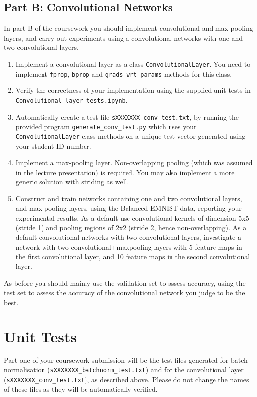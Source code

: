 \documentclass[11pt,]{article}
\begin{document}
\subsection*{Part B: Convolutional Networks}
In part B of the coursework you should implement convolutional  and max-pooling layers, and carry out experiments using a convolutional networks with one and two convolutional layers.  
\begin{enumerate}
  \item Implement a convolutional layer as a class \verb+ConvolutionalLayer+.  You need to implement \texttt{fprop}, \texttt{bprop} and \texttt{grads\_wrt\_params} methods for this class. 
  \item Verify the correctness of your implementation using the supplied unit tests in \verb+Convolutional_layer_tests.ipynb+.
  \item Automatically create a test file \verb+sXXXXXXX_conv_test.txt+, by running the provided program \verb+generate_conv_test.py+ which uses your \verb+ConvolutionalLayer+ class methods on a unique test vector generated using your student ID number.
  \item Implement a max-pooling layer. Non-overlapping pooling (which was assumed in the lecture presentation) is required. You may also implement a more generic solution with striding as well. 
  \item Construct and train networks containing one and two convolutional layers, and max-pooling layers, using the Balanced EMNIST data, reporting your experimental results.  As a default use convolutional kernels of dimension 5x5 (stride 1) and pooling regions of 2x2 (stride 2, hence non-overlapping).  As a default convolutional networks with two convolutional layers,  investigate a network with two convolutional+maxpooling layers with 5 feature maps in the first convolutional layer, and 10 feature maps in the second convolutional layer. 
\end{enumerate}
As before you should mainly use the validation set to assess accuracy, using the test set to assess the accuracy of the convolutional network you judge to be the best.






\section{Unit Tests}
\label{sec:tests}
Part one of your coursework submission will be the test files generated for batch normalisation (\verb+sXXXXXXX_batchnorm_test.txt+) and for the convolutional layer (\verb+sXXXXXXX_conv_test.txt+), as described above.  Please do not change the names of these files as they will be automatically verified.
\end{document}
